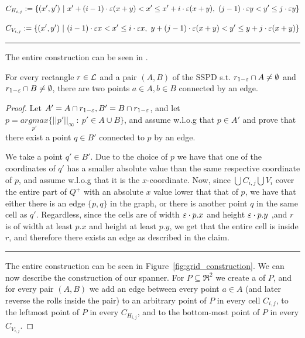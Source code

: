 \documentclass[12pt]{article}%
\begin{document}
\begin{equation}
    C_{H_{i,j}}:=\{(x',y')~|~  x' + (i-1)\cdot \varepsilon (x+y) < x' \leq x'
    + i\cdot \varepsilon (x+y),~ (j-1)\cdot \varepsilon y< y' \leq j\cdot \varepsilon y\}
\end{equation}

\begin{equation}
    C_{V_{i,j}}:=\{(x',y')~|~  (i-1)\cdot \varepsilon x < x' \leq i\cdot \varepsilon
    x,~ y + (j-1)\cdot \varepsilon (x+y)< y' \leq y + j\cdot \varepsilon (x+y)\}
\end{equation}

\hrule

The entire construction can be seen in .


\begin{claim}
    For every rectangle $r\in \mathcal{L}$ and a pair $(A,B)$ of the SSPD
    s.t. $r_{1-\varepsilon}\cap A \neq \emptyset$ and
    $r_{1-\varepsilon}\cap B \neq \emptyset$, there are two points
    $a\in A, b\in B$ connected by an edge.
\end{claim}

\begin{proof}
    Let $A'=A\cap r_{1-\varepsilon}, B'=B \cap r_{1-\varepsilon}$, and let
    $p= \underset{p'}{argmax}\{||p'||_{\infty}~:~ p'\in A\cup B\}$,
    and assume w.l.o.g that $p\in A'$ and prove that there exist a
    point $q\in B'$ connected to $p$ by an edge.
    
    We take a point $q'\in B'$. Due to the choice of $p$ we have that
    one of the coordinates of $q'$ has a smaller absolute value than
    the same respective coordinate of $p$, and assume w.l.o.g that it
    is the $x$-coordinate. Now, since $\bigcup C_{i,j} \bigcup V_i$
    cover the entire part of $Q^+$ with an absolute $x$ value lower
    that that of $p$, we have that either there is an edge $\{p,q\}$
    in the graph, or there is another point $q$ in the same cell as
    $q'$. Regardless, since the cells are of width $\varepsilon\cdot p.x$ and
    height $\varepsilon\cdot p.y$ ,and $r$ is of width at least $p.x$ and
    height at least $p.y$, we get that the entire cell is inside $r$,
    and therefore there exists an edge as described in the claim.
    
    \hrule

    The entire construction can be seen in
    Figure~\ref{fig:grid_construction}. We can now describe the
    construction of our spanner. For $P\subseteq \Re^2$ we create a
    \QSPD of $P$, and for every pair $(A,B)$ we add an edge between
    every point $a\in A$ (and later reverse the rolls inside the pair)
    to an arbitrary point of $P$ in every cell $C_{i,j}$, to the
    leftmost point of $P$ in every $C_{H_{i,j}}$, and to the
    bottom-most point of $P$ in every $C_{V_{i,j}}$.
\end{proof}
\end{document}
